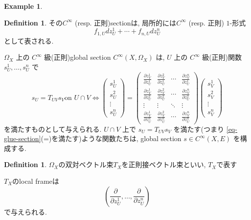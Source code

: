 \documentclass[dvipdfmx,a4paper,11pt]{article} %
\theoremstyle{definition}
\newtheorem{defn}[thm]{Definition}
\newtheorem{example}[thm]{Example}
\theoremstyle{remark}
\numberwithin{equation}{section}
\begin{document}
\begin{example}
\begin{defn}
その$C^{\infty}$ (resp. 正則)sectionは, 局所的には$C^{\infty}$ (resp. 正則) \(1\)-形式
\[
f_{1,U} dz_U^1 + \cdots + f_{n,U}dz_U^n
\]
として表される.
\end{defn}

\(\Omega_{X}\) 上の \(C^{\infty}\) 級(正則)global section \(C^{\infty}(X, \Omega_{X})\) は, \(U\) 上の \(C^{\infty}\) 級(正則)関数
\(s_U^1, \ldots,s_U^n\) で
\[
s_U=T_{UV}s_V \text{on $U\cap V$}
\Leftrightarrow 
\begin{pmatrix}
s_U^1\\
s_U^2\\
\vdots\\
s_U^n
\end{pmatrix}
=
\begin{pmatrix}
\frac{\partial z_V^1}{\partial z_U^1}
& \frac{\partial z_V^2}{\partial z_U^1}& \cdots 
& \frac{\partial z_V^n}{\partial z_U^1}\\
\frac{\partial z_V^1}{\partial z_U^2}& \frac{\partial z_V^2}{\partial z_U^2}& \cdots & \frac{\partial z_V^n}{\partial z_U^2}\\
\vdots & \vdots & \ddots & \vdots\\
\frac{\partial z_V^1}{\partial z_U^n}& \frac{\partial z_V^2}{\partial z_U^n}& \cdots & \frac{\partial z_V^n}{\partial z_U^n}
\end{pmatrix}
\begin{pmatrix}
s_V^1\\
s_V^2\\
\vdots\\
s_V^n
\end{pmatrix}
\]
を満たすものとして与えられる. \(U\cap V\) 上で \(s_U=T_{UV}s_V\) を満たす(つまり \eqref{eq-glue-section}(=)を満たす)ような関数たちは, global section \(s\in C^\infty(X,E)\) を構成する.
\begin{defn}
$\Omega_{X}$の双対ベクトル束$T_X$を正則接ベクトル束といい, $T_X$で表す 
\end{defn}
$T_X$のlocal frameは
$$
\left(\frac{\partial}{\partial z_U^1}, \ldots, \frac{\partial}{\partial z_U^n}
\right)
$$
で与えられる. 
\end{example}
\end{document}

